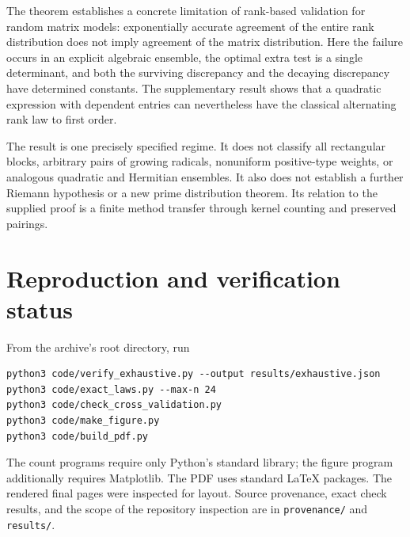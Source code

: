 \documentclass[11pt]{article}
\theoremstyle{definition}\newtheorem{definition}[theorem]{Definition}
\theoremstyle{remark}\newtheorem{remark}[theorem]{Remark}
\newcommand{\1}{\mathbf 1}
\begin{document}
The theorem establishes a concrete limitation of rank-based validation for
random matrix models: exponentially accurate agreement of the entire rank
distribution does not imply agreement of the matrix distribution. Here
the failure occurs in an explicit algebraic ensemble, the optimal extra
test is a single determinant, and both the surviving discrepancy and
the decaying discrepancy have determined constants. The supplementary
result shows that a quadratic expression with dependent entries can
nevertheless have the classical alternating rank law to first order.

The result is one precisely specified regime. It does not classify all
rectangular blocks, arbitrary pairs of growing radicals, nonuniform
positive-type weights, or analogous quadratic and Hermitian ensembles.
It also does not establish a further Riemann hypothesis or a new prime
distribution theorem. Its relation to the supplied proof is a finite
method transfer through kernel counting and preserved pairings.

\appendix
\section{Reproduction and verification status}
From the archive's root directory, run
\begin{verbatim}
python3 code/verify_exhaustive.py --output results/exhaustive.json
python3 code/exact_laws.py --max-n 24
python3 code/check_cross_validation.py
python3 code/make_figure.py
python3 code/build_pdf.py
\end{verbatim}
The count programs require only Python's standard library; the figure
program additionally requires Matplotlib. The PDF uses standard LaTeX
packages. The rendered final pages were inspected for layout. Source
provenance, exact check results, and the scope of the repository inspection
are in \texttt{provenance/} and \texttt{results/}.
\end{document}
